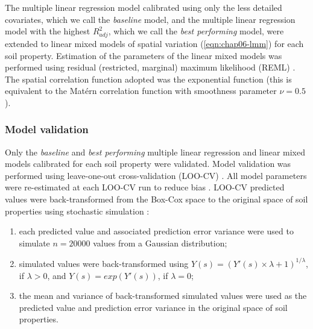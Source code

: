 The multiple linear regression model calibrated using only the less detailed covariates, which we call the 
\emph{baseline} model, and the multiple linear regression model with the highest ${R}^{2}_{adj}$, which we 
call the \emph{best performing} model, were extended to linear mixed models of spatial variation 
(\autoref{eqn:chap06-lmm}) for each soil property. Estimation of the parameters of the linear mixed models was 
performed using residual (restricted, marginal) maximum likelihood (REML) \cite{RibeiroEtAl2001, 
LarkEtAl2004}. The spatial correlation function adopted was the exponential function (this is equivalent to 
the Matérn correlation function with smoothness parameter $\nu = 0.5$ \cite{Stein1999}).

\subsubsection{Model validation}
\label{subsec:chap06-validation}

Only the \emph{baseline} and \emph{best performing} multiple linear regression and linear mixed models 
calibrated for each soil property were validated. Model validation was performed using leave-one-out 
cross-validation (LOO-CV) \cite{BrusEtAl2011}. All model parameters were re-estimated at each LOO-CV run 
to reduce bias \cite{LaslettEtAl1987}. LOO-CV predicted values were back-transformed from the Box-Cox space 
to the original space of soil properties using stochastic simulation \cite{ChristensenEtAl2001}:

\begin{enumerate}[label=(\Roman*)]
 \item each predicted value and associated prediction error variance were used to simulate $n = \num{20000}$ 
 values from a Gaussian distribution;
 
 \item simulated values were back-transformed using $Y(s) = (Y'(s) \times \lambda + 1)^{1 / \lambda}$, if 
 $\lambda > 0$, and $Y(s) = exp(Y'(s))$, if $\lambda = 0$;
 
 \item the mean and variance of back-transformed simulated values were used as the predicted value and 
 prediction error variance in the original space of soil properties.
\end{enumerate}

